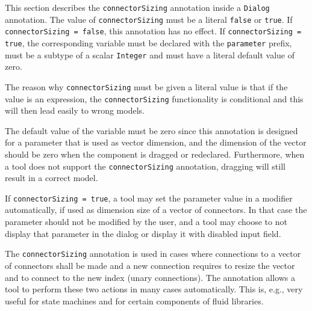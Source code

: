 This section describes the \lstinline!connectorSizing! annotation inside a \lstinline!Dialog! annotation.
The value of \lstinline!connectorSizing! must be a literal \lstinline!false! or \lstinline!true!.
If \lstinline!connectorSizing = false!, this annotation has no effect.
If \lstinline!connectorSizing = true!, the corresponding variable must be declared with the \lstinline!parameter! prefix, must be a subtype of a scalar \lstinline!Integer! and must have a literal default value of zero.

\begin{nonnormative}
The reason why \lstinline!connectorSizing! must be given a literal value is that if the value is an expression,
the \lstinline!connectorSizing! functionality is conditional and this will then lead easily to wrong models.

The default value of the variable must be zero since this annotation is designed for a parameter that is used as vector dimension, and the dimension of the vector should be zero when the component is dragged or redeclared.
Furthermore, when a tool does not support the \lstinline!connectorSizing! annotation, dragging will still result in a correct model.
\end{nonnormative}

If \lstinline!connectorSizing = true!, a tool may set the parameter value in a modifier automatically, if used as dimension size of a vector of connectors.
In that case the parameter should not be modified by the user, and a tool may choose to not display that parameter in the dialog or display it with disabled input field.

\begin{nonnormative}
The \lstinline!connectorSizing! annotation is used in cases where connections to a vector of connectors shall be made and a new connection requires to resize the vector and to connect to the new index (unary connections).
The annotation allows a tool to perform these two actions in many cases automatically.
This is, e.g., very useful for state machines and for certain components of fluid libraries.
\end{nonnormative}

